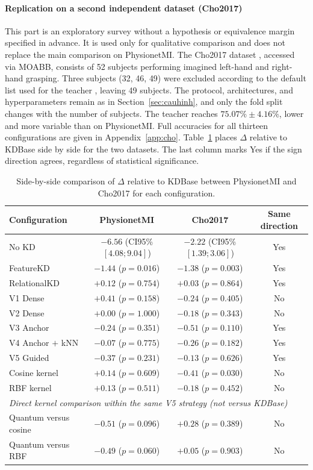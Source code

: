 \paragraph{Replication on a second independent dataset (Cho2017)}

This part is an exploratory survey without a hypothesis or equivalence
margin specified in advance. It is used only for qualitative comparison
and does not replace the main comparison on PhysionetMI. The Cho2017
dataset \cite{cho2017eeg}, accessed via MOABB, consists of 52 subjects
performing imagined left-hand and right-hand grasping. Three subjects
(32, 46, 49) were excluded according to the default list used for the
teacher \cite{zoumpourlis2024motor}, leaving 49 subjects. The protocol,
architectures, and hyperparameters remain as in
Section~\ref{sec:cauhinh}, and only the fold split changes with the
number of subjects. The teacher reaches $75.07\% \pm 4.16\%$, lower and
more variable than on PhysionetMI. Full accuracies for all thirteen
configurations are given in Appendix~\ref{app:cho}.
Table~\ref{tab:sosanh2dataset} places $\Delta$ relative to KDBase side
by side for the two datasets. The last column marks Yes if the sign
direction agrees, regardless of statistical significance.

\begin{table}[!htbp]
\centering
\caption{Side-by-side comparison of $\Delta$ relative to KDBase
between PhysionetMI and Cho2017 for each configuration.}
\label{tab:sosanh2dataset}
\small
\begin{tabular}{lccc}
\toprule
\textbf{Configuration} & \textbf{PhysionetMI} & \textbf{Cho2017} & \textbf{Same direction} \\
\midrule
No KD & $-6.56$ (CI95\% $[4.08;9.04]$) & $-2.22$ (CI95\% $[1.39;3.06]$) & Yes \\
FeatureKD & $-1.44$ ($p=0.016$) & $-1.38$ ($p=0.003$) & Yes \\
RelationalKD & $+0.12$ ($p=0.754$) & $+0.03$ ($p=0.864$) & Yes \\
V1 Dense & $+0.41$ ($p=0.158$) & $-0.24$ ($p=0.405$) & No \\
V2 Dense & $+0.00$ ($p=1.000$) & $-0.18$ ($p=0.343$) & No \\
V3 Anchor & $-0.24$ ($p=0.351$) & $-0.51$ ($p=0.110$) & Yes \\
V4 Anchor $+$ kNN & $-0.07$ ($p=0.775$) & $-0.26$ ($p=0.182$) & Yes \\
V5 Guided & $-0.37$ ($p=0.231$) & $-0.13$ ($p=0.626$) & Yes \\
Cosine kernel & $+0.14$ ($p=0.609$) & $-0.41$ ($p=0.030$) & No \\
RBF kernel & $+0.13$ ($p=0.511$) & $-0.18$ ($p=0.452$) & No \\
\midrule
\multicolumn{4}{l}{\textit{Direct kernel comparison within the same V5 strategy (not versus KDBase)}} \\
Quantum versus cosine & $-0.51$ ($p=0.096$) & $+0.28$ ($p=0.389$) & No \\
Quantum versus RBF & $-0.49$ ($p=0.060$) & $+0.05$ ($p=0.903$) & No \\
\bottomrule
\end{tabular}
\end{table}
\FloatBarrier

